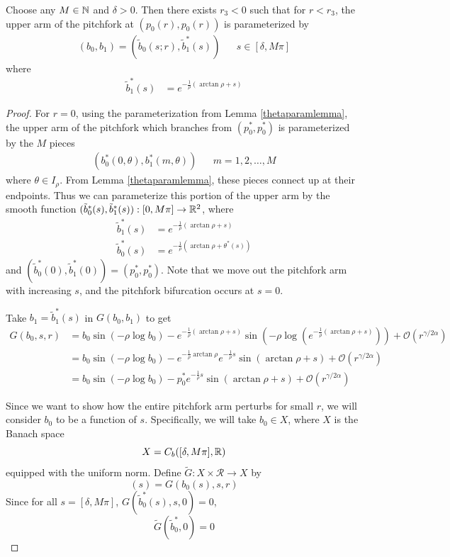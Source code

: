 \documentclass[thesis.tex]{subfiles}
\begin{document}
\begin{lemma}\label{upperarmpersists}
Choose any $M \in {\mathbb N}$ and $\delta > 0$. Then there exists $r_3 < 0$ such that for $r < r_3$, the upper arm of the pitchfork at $(p_0(r), p_0(r))$ is parameterized by
\begin{align*}
(b_0, b_1) = (\tilde{b}_0(s; r), \tilde{b}^*_1(s)) && s \in [\delta, M \pi]
\end{align*}
where
\begin{align*}
\tilde{b}_1^*(s) &= e^{-\frac{1}{\rho}(\arctan \rho + s)} 
\end{align*}

\begin{proof}
For $r = 0$, using the parameterization from Lemma \ref{thetaparamlemma}, the upper arm of the pitchfork which branches from $(p_0^*, p_0^*)$ is parameterized by the $M$ pieces
\begin{align}\label{Mpieceparam}
(b_0^*(0, \theta), b_1^*(m, \theta)) && m = 1, 2, \dots, M
\end{align}
where $\theta \in I_\rho$. From Lemma \ref{thetaparamlemma}, these pieces connect up at their endpoints. Thus we can parameterize this portion of the upper arm by the smooth function $(\tilde{b}^*_0(s), \tilde{b}^*_1(s)): [0, M \pi] \rightarrow {\mathbb R}^2$, where 
\begin{align*}
\tilde{b}_1^*(s) &= e^{-\frac{1}{\rho}(\arctan \rho +s)} \\
\tilde{b}_0^*(s) &= e^{-\frac{1}{\rho}(\arctan \rho + \theta^*(s))}
\end{align*}
and $(\tilde{b}^*_0(0), \tilde{b}^*_1(0)) = (p_0^*, p_0^*)$. Note that we move out the pitchfork arm with increasing $s$, and the pitchfork bifurcation occurs at $s = 0$.

Take $b_1 = \tilde{b}_1^*(s)$ in $G(b_0, b_1)$ to get
\begin{align*}
G(b_0, s, r) 
&= b_0 \sin(-\rho \log b_0) - e^{-\frac{1}{\rho}(\arctan \rho + s)} \sin\left(-\rho \log \left( e^{-\frac{1}{\rho}(\arctan \rho + s)}\right)\right) + \mathcal{O}(r^{\gamma/2\alpha}) \\
&= b_0 \sin(-\rho \log b_0) - e^{-\frac{1}{\rho}\arctan \rho}e^{-\frac{1}{\rho}s} \sin\left(\arctan \rho + s \right) + \mathcal{O}(r^{\gamma/2\alpha}) \\
&= b_0 \sin(-\rho \log b_0) - p_0^* e^{-\frac{1}{\rho}s} \sin\left(\arctan \rho + s \right) + \mathcal{O}(r^{\gamma/2\alpha}) 
\end{align*}

Since we want to show how the entire pitchfork arm perturbs for small $r$, we will consider $b_0$ to be a function of $s$. Specifically, we will take $b_0 \in X$, where $X$ is the Banach space
\[
X = C_b([\delta, M \pi], {\mathbb R})
\]
equipped with the uniform norm. Define $\tilde{G}: X \times \mathcal{R} \rightarrow X$ by 
\begin{equation}
[\tilde{G}(b_0, r)](s) = G(b_0(s), s, r) 
\end{equation}
Since for all $s = [\delta, M \pi]$, $G(\tilde{b}_0^*(s), s, 0) = 0$, 
\[
\tilde{G}(\tilde{b}_0^*, 0) = 0
\]


\end{proof}
\end{lemma}
\end{document}
